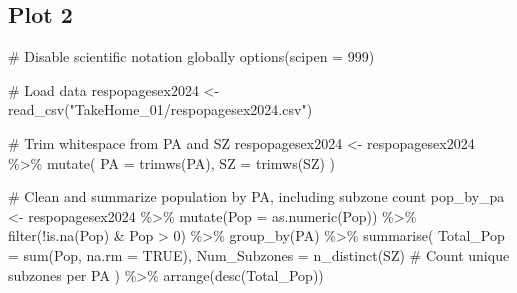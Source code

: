\documentclass[
  letterpaper,
  DIV=11,
  numbers=noendperiod]{scrartcl}
\newenvironment{Shaded}{\begin{snugshade}}{\end{snugshade}}
\newcommand{\AttributeTok}[1]{\textcolor[rgb]{0.40,0.45,0.13}{#1}}
\newcommand{\CommentTok}[1]{\textcolor[rgb]{0.37,0.37,0.37}{#1}}
\newcommand{\ConstantTok}[1]{\textcolor[rgb]{0.56,0.35,0.01}{#1}}
\newcommand{\DecValTok}[1]{\textcolor[rgb]{0.68,0.00,0.00}{#1}}
\newcommand{\FunctionTok}[1]{\textcolor[rgb]{0.28,0.35,0.67}{#1}}
\newcommand{\NormalTok}[1]{\textcolor[rgb]{0.00,0.23,0.31}{#1}}
\newcommand{\OtherTok}[1]{\textcolor[rgb]{0.00,0.23,0.31}{#1}}
\newcommand{\SpecialCharTok}[1]{\textcolor[rgb]{0.37,0.37,0.37}{#1}}
\newcommand{\StringTok}[1]{\textcolor[rgb]{0.13,0.47,0.30}{#1}}
\begin{document}
\subsection{Plot 2}\label{plot-2}

\begin{Shaded}
\begin{Highlighting}[]
\CommentTok{\# Disable scientific notation globally}
\FunctionTok{options}\NormalTok{(}\AttributeTok{scipen =} \DecValTok{999}\NormalTok{)}

\CommentTok{\# Load data}
\NormalTok{respopagesex2024 }\OtherTok{\textless{}{-}} \FunctionTok{read\_csv}\NormalTok{(}\StringTok{"TakeHome\_01/respopagesex2024.csv"}\NormalTok{)}

\CommentTok{\# Trim whitespace from PA and SZ}
\NormalTok{respopagesex2024 }\OtherTok{\textless{}{-}}\NormalTok{ respopagesex2024 }\SpecialCharTok{\%\textgreater{}\%}
  \FunctionTok{mutate}\NormalTok{(}
    \AttributeTok{PA =} \FunctionTok{trimws}\NormalTok{(PA),}
    \AttributeTok{SZ =} \FunctionTok{trimws}\NormalTok{(SZ)}
\NormalTok{  )}

\CommentTok{\# Clean and summarize population by PA, including subzone count}
\NormalTok{pop\_by\_pa }\OtherTok{\textless{}{-}}\NormalTok{ respopagesex2024 }\SpecialCharTok{\%\textgreater{}\%}
  \FunctionTok{mutate}\NormalTok{(}\AttributeTok{Pop =} \FunctionTok{as.numeric}\NormalTok{(Pop)) }\SpecialCharTok{\%\textgreater{}\%}
  \FunctionTok{filter}\NormalTok{(}\SpecialCharTok{!}\FunctionTok{is.na}\NormalTok{(Pop) }\SpecialCharTok{\&}\NormalTok{ Pop }\SpecialCharTok{\textgreater{}} \DecValTok{0}\NormalTok{) }\SpecialCharTok{\%\textgreater{}\%}
  \FunctionTok{group\_by}\NormalTok{(PA) }\SpecialCharTok{\%\textgreater{}\%}
  \FunctionTok{summarise}\NormalTok{(}
    \AttributeTok{Total\_Pop =} \FunctionTok{sum}\NormalTok{(Pop, }\AttributeTok{na.rm =} \ConstantTok{TRUE}\NormalTok{),}
    \AttributeTok{Num\_Subzones =} \FunctionTok{n\_distinct}\NormalTok{(SZ)  }\CommentTok{\# Count unique subzones per PA}
\NormalTok{  ) }\SpecialCharTok{\%\textgreater{}\%}
  \FunctionTok{arrange}\NormalTok{(}\FunctionTok{desc}\NormalTok{(Total\_Pop))}


\end{Highlighting}
\end{Shaded}
\end{document}
